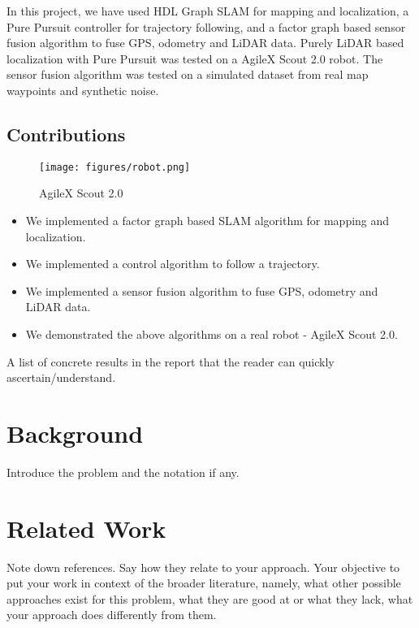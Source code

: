 \documentclass[10pt, reqno, letterpaper, twoside]{amsart}
\begin{document}
In this project, we have used HDL Graph SLAM for mapping and localization, a Pure Pursuit controller for trajectory following, and a factor graph based sensor fusion algorithm to fuse GPS, odometry and LiDAR data. Purely LiDAR based localization with Pure Pursuit was tested on a AgileX Scout 2.0 robot. The sensor fusion algorithm was tested on a simulated dataset from real map waypoints and synthetic noise.


\subsection{Contributions}

\begin{figure}[h]
    \centering
    \texttt{[image: figures/robot.png]}
    \caption{AgileX Scout 2.0}
    \label{fig:robot}
\end{figure}

\begin{itemize}
    \item We implemented a factor graph based SLAM algorithm for mapping and localization.
    \item We implemented a control algorithm to follow a trajectory.
    \item We implemented a sensor fusion algorithm to fuse GPS, odometry and LiDAR data.
    \item We demonstrated the above algorithms on a real robot - AgileX Scout 2.0.

\end{itemize}

A list of concrete results in the report that the reader can quickly ascertain/understand.

\section{Background}

Introduce the problem and the notation if any.

\section{Related Work}

Note down references. Say how they relate to your approach. Your objective to put your work in context of the broader literature, namely, what other possible approaches exist for this problem, what they are good at or what they lack, what your approach does differently from them.
\end{document}
